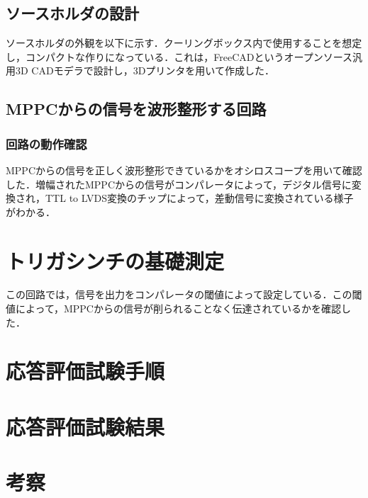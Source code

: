 \subsection{ソースホルダの設計}
ソースホルダの外観を以下に示す．クーリングボックス内で使用することを想定し，コンパクトな作りになっている．これは，FreeCADというオープンソース汎用3D CADモデラで設計し，3Dプリンタを用いて作成した．

\subsection{MPPCからの信号を波形整形する回路}

\subsubsection*{回路の動作確認}
MPPCからの信号を正しく波形整形できているかをオシロスコープを用いて確認した．増幅されたMPPCからの信号がコンパレータによって，デジタル信号に変換され，TTL to LVDS変換のチップによって，差動信号に変換されている様子がわかる．

\section{トリガシンチの基礎測定}
この回路では，信号を出力をコンパレータの閾値によって設定している．この閾値によって，MPPCからの信号が削られることなく伝達されているかを確認した．

\section{応答評価試験手順}
\label{sec:exthow}
\section{応答評価試験結果}
\label{sec:extconc}
\section{考察}
\label{sec:extsum}
